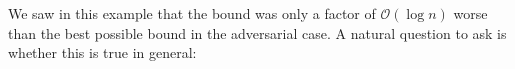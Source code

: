 We saw in this example that the bound was only a factor of $\mathcal{O}(\log n)$ worse than the best possible bound in the adversarial case.  A natural question to ask is whether this is true in general: 






